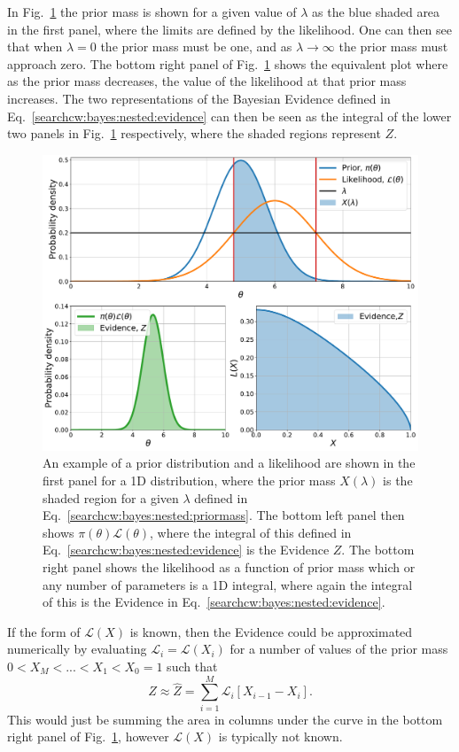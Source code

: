 In Fig.~\ref{cwinto:bayes:nestedsampling:plots} the prior mass is shown for a given value of $\lambda$ as the blue shaded area in the first panel, where the limits are defined by the likelihood.
One can then see that when $\lambda= 0$ the prior mass must be one, and as $\lambda \rightarrow \infty$ the prior mass must approach zero. The bottom right panel of Fig.~\ref{cwinto:bayes:nestedsampling:plots} shows the equivalent plot where as the prior mass decreases, the value of the likelihood at that prior mass increases.
The two representations of the Bayesian Evidence defined in Eq.~\ref{searchcw:bayes:nested:evidence} can then be seen as the integral of the lower two panels in Fig.~\ref{cwinto:bayes:nestedsampling:plots} respectively, where the shaded regions represent $Z$. 
%
\begin{figure}[ht]
	\centering
	\includegraphics[width=0.8\linewidth]{C2_cw/nested_plots.pdf}
	\caption[Nested sampling]{An example of a prior distribution and a likelihood are shown in the first panel for a 1D distribution, where the prior mass $X(\lambda)$ is the shaded region for a given $\lambda$ defined in Eq.~\ref{searchcw:bayes:nested:priormass}. The bottom left panel then shows $\pi(\theta)\mathcal{L}(\theta)$, where the integral of this defined in Eq.~\ref{searchcw:bayes:nested:evidence} is the Evidence $Z$. The bottom right panel shows the likelihood as a function of prior mass which or any number of parameters is a 1D integral, where again the integral of this is the Evidence in Eq.~\ref{searchcw:bayes:nested:evidence}.}
	\label{cwinto:bayes:nestedsampling:plots}
\end{figure}
%

If the form of $\mathcal{L}(X)$ is known, then the Evidence could be approximated numerically by evaluating $\mathcal{L}_i = \mathcal{L}(X_i)$ for a number of values of the prior mass $0 < X_M < ... < X_1 < X_0 = 1$ such that
\begin{equation}
\label{searchcw:bayes:nested:evidence_trapz}
Z \approx \hat{Z} = \sum_{i=1}^{M} \mathcal{L}_i \left[  X_{i-1} - X_{i}\right].
\end{equation} 
This would just be summing the area in columns under the curve in the bottom right panel of Fig.~\ref{cwinto:bayes:nestedsampling:plots}, however $\mathcal{L}(X)$  is typically not known.

